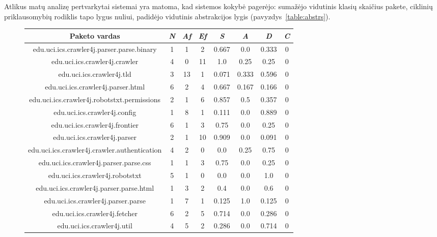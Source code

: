Atlikus matų analizę pertvarkytai sistemai yra matoma, kad sistemos kokybė pagerėjo:
sumažėjo vidutinis klasių skaičius pakete, ciklinių priklausomybių rodiklis tapo lygus nuliui,
padidėjo vidutinis abstrakcijos lygis (pavyzdys~\ref{table:abstrs}).
\begin{figure}[H]
\begin{center}
    \begin{tabular}{|c|c|c|c|c|c|c|c|}
        \hline
        Paketo vardas & \textit{N} & \textit{Af} & \textit{Ef} & \textit{S} & \textit{A} & \textit{D} & \textit{C} \\ [0.5ex]
        \hline\hline
        edu.uci.ics.crawler4j.parser.parse.binary & 1 & 1 & 2 & 0.667 & 0.0 & 0.333 & 0 \\
        \hline
        edu.uci.ics.crawler4j.crawler & 4 & 0 & 11 & 1.0 & 0.25 & 0.25 & 0 \\
        \hline
        edu.uci.ics.crawler4j.tld & 3 & 13 & 1 & 0.071 & 0.333 & 0.596 & 0 \\
        \hline
        edu.uci.ics.crawler4j.parser.html & 6 & 2 & 4 & 0.667 & 0.167 & 0.166 & 0 \\
        \hline
        edu.uci.ics.crawler4j.robotstxt.permissions & 2 & 1 & 6 & 0.857 & 0.5 & 0.357 & 0 \\
        \hline
        edu.uci.ics.crawler4j.config & 1 & 8 & 1 & 0.111 & 0.0 & 0.889 & 0 \\
        \hline
        edu.uci.ics.crawler4j.frontier & 6 & 1 & 3 & 0.75 & 0.0 & 0.25 & 0 \\
        \hline
        edu.uci.ics.crawler4j.parser & 2 & 1 & 10 & 0.909 & 0.0 & 0.091 & 0\\
        \hline
        edu.uci.ics.crawler4j.crawler.authentication & 4 & 2 & 0 & 0.0 & 0.25 & 0.75 & 0 \\
        \hline
        edu.uci.ics.crawler4j.parser.parse.css & 1 & 1 & 3 & 0.75 & 0.0 & 0.25 & 0 \\
        \hline
        edu.uci.ics.crawler4j.robotstxt & 5 & 1 & 0 & 0.0 & 0.0 & 1.0 & 0 \\
        \hline
        edu.uci.ics.crawler4j.parser.parse.html & 1 & 3 & 2 & 0.4 & 0.0 & 0.6 & 0 \\
        \hline
        edu.uci.ics.crawler4j.parser.parse & 1 & 7 & 1 & 0.125 & 1.0 & 0.125 & 0\\
        \hline
        edu.uci.ics.crawler4j.fetcher & 6 & 2 & 5 & 0.714 & 0.0 & 0.286 & 0 \\
        \hline
        edu.uci.ics.crawler4j.util & 4 & 5 & 2 & 0.286 & 0.0 & 0.714 & 0 \\

\end{tabular}
\end{center}
\end{figure}
